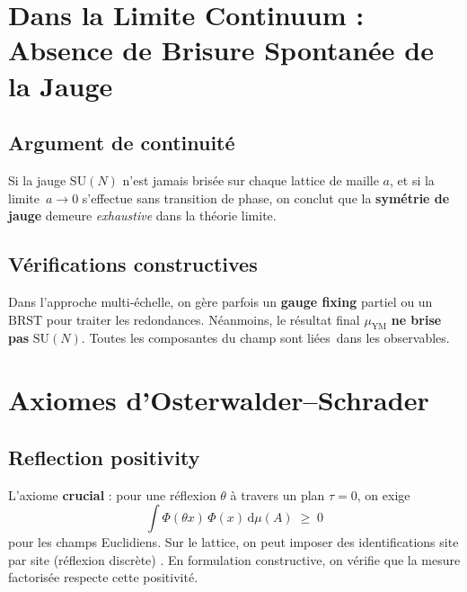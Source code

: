 \section{Dans la Limite Continuum : Absence de Brisure Spontanée de la Jauge}
\label{sec:8.2}

\subsection*{Argument de continuité}
Si la jauge \(\mathrm{SU}(N)\) n’est jamais brisée sur chaque lattice de maille \(a\), et si la limite \(\,a \to 0\) s’effectue sans transition de phase, on conclut que la \textbf{symétrie de jauge} demeure \emph{exhaustive} dans la théorie limite. 

\subsection*{Vérifications constructives}
Dans l’approche multi-échelle, on gère parfois un \textbf{gauge fixing} partiel ou un \(\mathrm{BRST}\) pour traiter les redondances. Néanmoins, le résultat final \(\mu_{\mathrm{YM}}\) \textbf{ne brise pas} \(\mathrm{SU}(N)\). Toutes les composantes du champ sont \og liées\fg\ dans les observables.

\vspace{1em}

\section{Axiomes d’Osterwalder--Schrader}
\label{sec:8.3}

\subsection*{Reflection positivity}
L’axiome \textbf{crucial} : pour une réflexion \(\theta\) à travers un plan \(\tau=0\), on exige
\[
\int \Phi(\theta x)\,\Phi(x)\,\mathrm{d}\mu(A) \;\ge\; 0
\]
pour les champs Euclidiens. Sur le lattice, on peut imposer des identifications site par site (réflexion discrète) \cite{OsterwalderSeiler1977}. En formulation constructive, on vérifie que la mesure factorisée respecte cette positivité.

